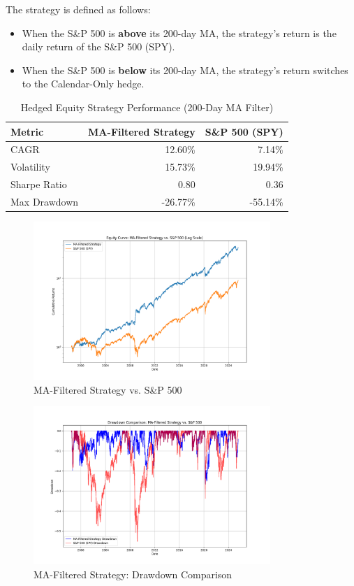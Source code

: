 \documentclass{article}
\begin{document}
The strategy is defined as follows:
\begin{itemize}
    \item When the S\&P 500 is \textbf{above} its 200-day MA, the strategy's return is the daily return of the S\&P 500 (SPY).
    \item When the S\&P 500 is \textbf{below} its 200-day MA, the strategy's return switches to the Calendar-Only hedge.
\end{itemize}

\begin{table}[htbp]
\centering
\caption{Hedged Equity Strategy Performance (200-Day MA Filter)}
\begin{tabular}{lrr}
\toprule
\textbf{Metric} & \textbf{MA-Filtered Strategy} & \textbf{S\&P 500 (SPY)} \\
\midrule
CAGR           & 12.60\%    & 7.14\%         \\
Volatility     & 15.73\%   & 19.94\%        \\
Sharpe Ratio   & 0.80      & 0.36           \\
Max Drawdown   & -26.77\% & -55.14\%      \\
\bottomrule
\end{tabular}
\end{table}

\begin{figure}[htbp]
    \centering
    \includegraphics[width=0.8\textwidth]{plot_ma_strategy_equity_curve.png}
    \caption{MA-Filtered Strategy vs. S\&P 500}
    \label{fig:ma_filtered_equity_curve}
\end{figure}

\begin{figure}[htbp]
    \centering
    \includegraphics[width=0.8\textwidth]{plot_ma_strategy_drawdowns.png}
    \caption{MA-Filtered Strategy: Drawdown Comparison}
    \label{fig:ma_filtered_drawdowns}
\end{figure}
\end{document}
